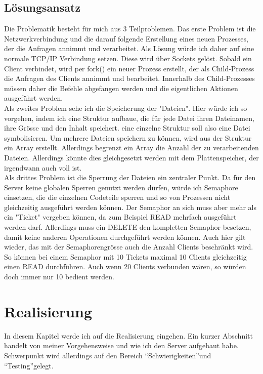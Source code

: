\documentclass[12pt,a4paper,ngerman]{report}
\begin{document}
\section{Lösungsansatz}
Die Problematik besteht für mich aus 3 Teilproblemen. Das erste Problem ist die Netzwerkverbindung und die darauf folgende Erstellung eines neuen Prozesses, der die Anfragen annimmt und verarbeitet. Als Lösung würde ich daher auf eine normale TCP/IP Verbindung setzen. Diese wird über Sockets gelöst. Sobald ein Client verbindet, wird per fork() ein neuer Prozess erstellt, der als Child-Prozess die Anfragen des Clients annimmt und bearbeitet. Innerhalb des Child-Prozesses müssen daher die Befehle abgefangen werden und die eigentlichen Aktionen ausgeführt werden.
\\
Als zweites Problem sehe ich die Speicherung der "Dateien". Hier würde ich so vorgehen, indem ich eine Struktur aufbaue, die für jede Datei ihren Dateinamen, ihre Grösse und den Inhalt speichert. eine einzelne Struktur soll also eine Datei symbolisieren. Um mehrere Dateien speichern zu können, wird aus der Struktur ein Array erstellt. Allerdings begrenzt ein Array die Anzahl der zu verarbeitenden Dateien. Allerdings könnte dies gleichgesetzt werden mit dem Plattenspeicher, der irgendwann auch voll ist.
\\
Als drittes Problem ist die Sperrung der Dateien ein zentraler Punkt. Da für den Server keine globalen Sperren genutzt werden dürfen, würde ich Semaphore einsetzen, die die einzelnen Codeteile sperren und so von Prozessen nicht gleichzeitig ausgeführt werden können. Der Semaphor an sich muss aber mehr als ein "Ticket" vergeben können, da zum Beispiel READ mehrfach ausgeführt werden darf. Allerdings muss ein DELETE den kompletten Semaphor besetzen, damit keine anderen Operationen durchgeführt werden können.
Auch hier gilt wieder, das mit der Semaphorengrösse auch die Anzahl Clients beschränkt wird. So können bei einem Semaphor mit 10 Tickets maximal 10 Clients gleichzeitig einen READ durchführen. Auch wenn 20 Clients verbunden wären, so würden doch immer nur 10 bedient werden.
\chapter{Realisierung}
In diesem Kapitel werde ich auf die Realisierung eingehen. Ein kurzer Abschnitt handelt von meiner Vorgehensweise und wie ich den Server aufgebaut habe. Schwerpunkt wird allerdings auf den Bereich \textquotedblleft Schwierigkeiten\textquotedblright und \textquotedblleft Testing\textquotedblright gelegt.
\end{document}
